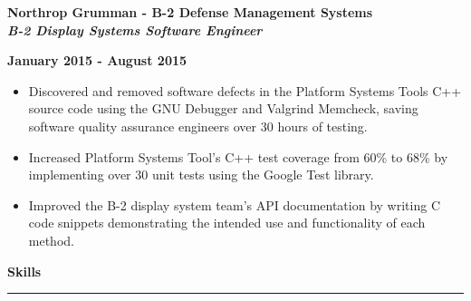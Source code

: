 \documentclass[10pt,letterpaper]{article}
\begin{document}
\begin{minipage}[t]{0.53\textwidth}
        \begin{flushleft}
                \textbf{Northrop Grumman - B-2 Defense Management Systems}\\
                \textbf{\textit{B-2 Display Systems Software Engineer}}\\
        \end{flushleft}
\end{minipage}
\begin{minipage}[t]{0.44\textwidth}
        \begin{flushright}
                \textbf{January 2015 - August 2015}
        \end{flushright}
\end{minipage}

\begin{itemize}[noitemsep,topsep=0pt]
        \setlength\itemsep{-0.10em}
        \item Discovered and removed software defects in the
              Platform Systems Tools C++ source code using the GNU Debugger and Valgrind
              Memcheck, saving software quality assurance engineers over 30 hours of
              testing.
        \item Increased Platform Systems Tool's C++ test coverage from 60\% to 68\% by
              implementing over 30 unit tests using the Google Test library.
        \item Improved the B-2 display system team's API documentation by writing C code
              snippets demonstrating the intended use and functionality of each method.
\end{itemize}

\medskip

\begin{large}
        \textbf{Skills}
\end{large}

\smallskip \hrule \smallskip
\end{document}
